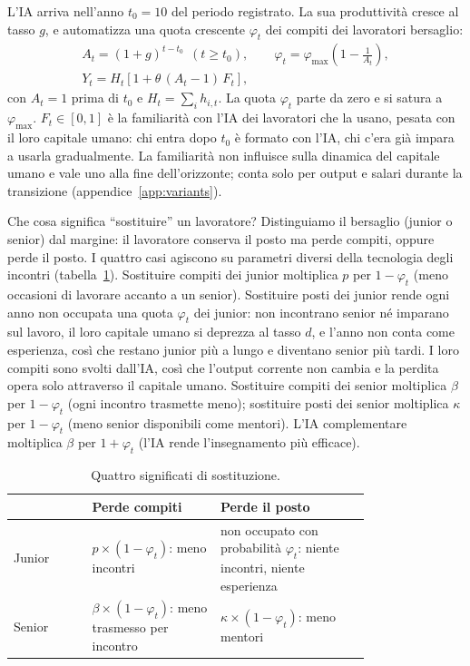 \documentclass[preprint,12pt,authoryear]{elsarticle}
\begin{document}
L'IA arriva nell'anno $t_0=10$ del periodo registrato. La sua produttività cresce al tasso $g$, e automatizza una quota crescente $\varphi_t$ dei compiti dei lavoratori bersaglio:
\begin{gather}
A_t = (1+g)^{t-t_0}\ \ (t\ge t_0), \qquad \varphi_t = \varphi_{\max}\left(1-\frac{1}{A_t}\right), \label{eq:ai}\\
Y_t = H_t\left[1+\theta\,(A_t-1)\,F_t\right], \label{eq:aiY}
\end{gather}
con $A_t=1$ prima di $t_0$ e $H_t=\sum_i h_{i,t}$. La quota $\varphi_t$ parte da zero e si satura a $\varphi_{\max}$. $F_t\in[0,1]$ è la familiarità con l'IA dei lavoratori che la usano, pesata con il loro capitale umano: chi entra dopo $t_0$ è formato con l'IA, chi c'era già impara a usarla gradualmente. La familiarità non influisce sulla dinamica del capitale umano e vale uno alla fine dell'orizzonte; conta solo per output e salari durante la transizione (appendice~\ref{app:variants}).

Che cosa significa ``sostituire'' un lavoratore? Distinguiamo il bersaglio (junior o senior) dal margine: il lavoratore conserva il posto ma perde compiti, oppure perde il posto. I quattro casi agiscono su parametri diversi della tecnologia degli incontri (tabella~\ref{tab:margins}). Sostituire compiti dei junior moltiplica $p$ per $1-\varphi_t$ (meno occasioni di lavorare accanto a un senior). Sostituire posti dei junior rende ogni anno non occupata una quota $\varphi_t$ dei junior: non incontrano senior né imparano sul lavoro, il loro capitale umano si deprezza al tasso $d$, e l'anno non conta come esperienza, così che restano junior più a lungo e diventano senior più tardi. I loro compiti sono svolti dall'IA, così che l'output corrente non cambia e la perdita opera solo attraverso il capitale umano. Sostituire compiti dei senior moltiplica $\beta$ per $1-\varphi_t$ (ogni incontro trasmette meno); sostituire posti dei senior moltiplica $\kappa$ per $1-\varphi_t$ (meno senior disponibili come mentori). L'IA complementare moltiplica $\beta$ per $1+\varphi_t$ (l'IA rende l'insegnamento più efficace).

\begin{table}[t]\centering\small
\caption{Quattro significati di sostituzione.}\label{tab:margins}
\begin{tabular}{@{}lp{0.36\linewidth}p{0.42\linewidth}@{}}
\toprule
 & Perde compiti & Perde il posto \\
\midrule
Junior & $p\times(1-\varphi_t)$: meno incontri & non occupato con probabilità $\varphi_t$: niente incontri, niente esperienza \\
Senior & $\beta\times(1-\varphi_t)$: meno trasmesso per incontro & $\kappa\times(1-\varphi_t)$: meno mentori \\
\bottomrule
\end{tabular}
\end{table}
\end{document}
